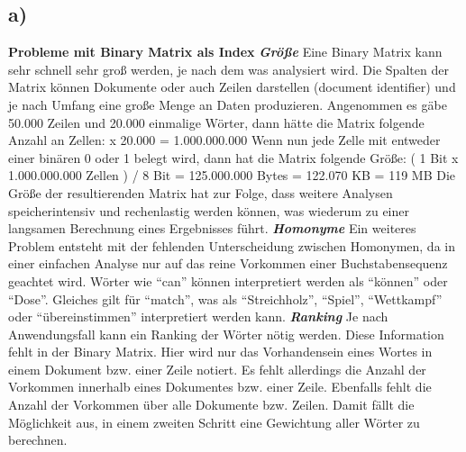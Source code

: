 \documentclass[
     11pt,         %
     a4paper,      %
     oneside,
     ]{article}
\begin{document}
\subsection{a)}
\textbf{Probleme mit Binary Matrix als Index}\newline
\textbf{\textit{Größe}}\newline
Eine Binary Matrix kann sehr schnell sehr groß werden, je nach dem was analysiert wird. Die Spalten der Matrix können Dokumente oder auch Zeilen darstellen (document identifier) und je nach Umfang eine große Menge an Daten produzieren.\newline
\newline
Angenommen es gäbe 50.000 Zeilen und 20.000 einmalige Wörter, dann hätte die Matrix folgende Anzahl an Zellen: x 20.000 = 1.000.000.000\newline
\newline
Wenn nun jede Zelle mit entweder einer binären 0 oder 1 belegt wird, dann hat die Matrix folgende Größe:\newline
( 1 Bit x 1.000.000.000 Zellen ) / 8 Bit = 125.000.000 Bytes = 122.070 KB = 119 MB\newline
\newline
Die Größe der resultierenden Matrix hat zur Folge, dass weitere Analysen speicherintensiv und rechenlastig werden können, was wiederum zu einer langsamen Berechnung eines Ergebnisses führt.\newline
\newline
\textbf{\textit{Homonyme}}\newline
Ein weiteres Problem entsteht mit der fehlenden Unterscheidung zwischen Homonymen, da in einer einfachen Analyse nur auf das reine Vorkommen einer Buchstabensequenz geachtet wird.\newline
\newline
Wörter wie “can” können interpretiert werden als “können” oder “Dose”. Gleiches gilt für “match”, was als “Streichholz”, “Spiel”, “Wettkampf” oder “übereinstimmen” interpretiert werden kann.\newline
\newline
\textbf{\textit{Ranking}}\newline
Je nach Anwendungsfall kann ein Ranking der Wörter nötig werden. Diese Information fehlt in der Binary Matrix. Hier wird nur das Vorhandensein eines Wortes in einem Dokument bzw. einer Zeile notiert. Es fehlt allerdings die Anzahl der Vorkommen innerhalb eines Dokumentes bzw. einer Zeile. Ebenfalls fehlt die Anzahl der Vorkommen über alle Dokumente bzw. Zeilen. Damit fällt die Möglichkeit aus, in einem zweiten Schritt eine Gewichtung aller Wörter zu berechnen.\newline
\end{document}
